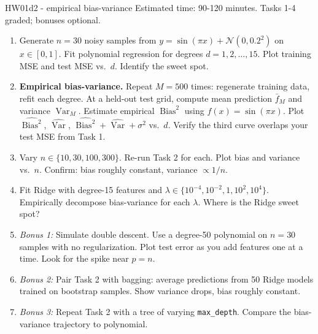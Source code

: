 \documentclass[aspectratio=169]{beamer}
\newcommand{\Var}{\operatorname{Var}}
\newcommand{\Bias}{\operatorname{Bias}}
\begin{document}
\begin{frame}{HW01d2 - empirical bias-variance}
  \footnotesize Estimated time: 90-120 minutes. Tasks 1-4 graded; bonuses optional.
  \begin{enumerate}\small
    \item Generate $n = 30$ noisy samples from $y = \sin(\pi x) + \mathcal{N}(0, 0.2^2)$ on $x \in [0,1]$. Fit polynomial regression for degrees $d = 1, 2, \ldots, 15$. Plot training MSE and test MSE vs.\ $d$. Identify the sweet spot.
    \item \textbf{Empirical bias-variance.} Repeat $M = 500$ times: regenerate training data, refit each degree. At a held-out test grid, compute mean prediction $\bar{f}_M$ and variance $\Var_M$. Estimate empirical $\Bias^2$ using $f(x) = \sin(\pi x)$. Plot $\widehat{\Bias^2}$, $\widehat{\Var}$, $\widehat{\Bias^2} + \widehat{\Var} + \sigma^2$ vs.\ $d$. Verify the third curve overlaps your test MSE from Task 1.
    \item Vary $n \in \{10, 30, 100, 300\}$. Re-run Task 2 for each. Plot bias and variance vs.\ $n$. Confirm: bias roughly constant, variance $\propto 1/n$.
    \item Fit Ridge with degree-15 features and $\lambda \in \{10^{-4}, 10^{-2}, 1, 10^2, 10^4\}$. Empirically decompose bias-variance for each $\lambda$. Where is the Ridge sweet spot?
    \item \emph{Bonus 1:} Simulate double descent. Use a degree-50 polynomial on $n = 30$ samples with no regularization. Plot test error as you add features one at a time. Look for the spike near $p = n$.
    \item \emph{Bonus 2:} Pair Task 2 with bagging: average predictions from 50 Ridge models trained on bootstrap samples. Show variance drops, bias roughly constant.
    \item \emph{Bonus 3:} Repeat Task 2 with a tree of varying \texttt{max\_depth}. Compare the bias-variance trajectory to polynomial.
  \end{enumerate}
\end{frame}
\end{document}
